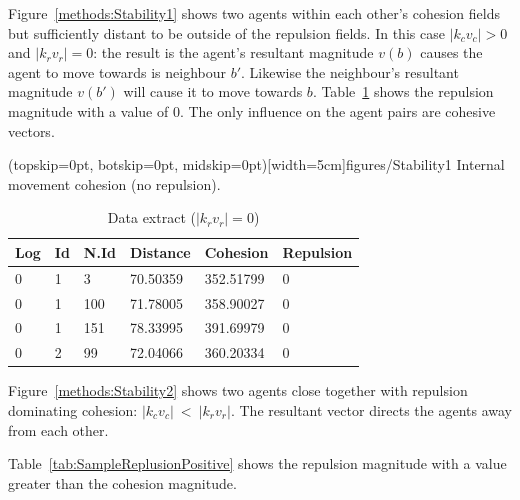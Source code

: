 \documentclass{ieeeaccess}
\begin{document}
Figure~\ref{methods:Stability1} shows two agents within each other's cohesion fields but sufficiently distant to be outside of the repulsion fields. In this case $|k_cv_c| > 0$ and $|k_rv_r| = 0$: the result is the agent's resultant magnitude $v(b)$ causes the agent to move towards is neighbour $b'$. Likewise the neighbour's resultant magnitude $v(b')$ will cause it to move towards $b$. Table~\ref{tab:SampleReplusion0} shows the repulsion magnitude with a value of 0. The only influence on the agent pairs are cohesive vectors. 

\Figure[t!](topskip=0pt, botskip=0pt, midskip=0pt)[width=5cm]{figures/Stability1}
{Internal movement cohesion (no repulsion).\label{methods:Stability1}}


\begin{table}[H]
\begin{center}
\begin{tabular}{| l | l | l | l | l | l |}
\hline
Log &	Id &	N.Id &	Distance &	{\color{green}Cohesion} &	{\color{red}Repulsion} 	\\ \hline
0 &	1 &	3 	 & 70.50359 &	{\color{green}352.51799} &	{\color{red}0} \\ \hline
0 &	1 &	100 & 71.78005 &	{\color{green}358.90027} &	{\color{red}0} \\ \hline
0 &	1 &	151 & 78.33995 &	{\color{green}391.69979} &	{\color{red}0} \\ \hline
0 &	2 &	99  &	72.04066 &	{\color{green}360.20334} &	{\color{red}0} \\ 
\hline
\end{tabular}\caption{Data extract ($|k_rv_r| = 0$)} \label{tab:SampleReplusion0}
\end{center}
\end{table}

Figure~\ref{methods:Stability2} shows two agents close together with repulsion dominating cohesion: $|k_cv_c|~<~|k_rv_r|$. The resultant vector directs the agents away from each other. 

Table~\ref{tab:SampleReplusionPositive} shows the repulsion magnitude with a value greater than the cohesion magnitude.
\end{document}
